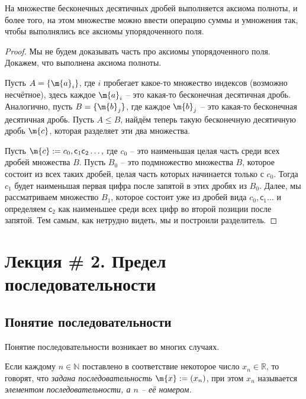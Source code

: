 \begin{theorem}
    На множестве бесконечных десятичных дробей выполняется аксиома полноты, и более того, на этом множестве можно ввести операцию суммы и умножения так, чтобы выполнялись все аксиомы упорядоченного поля. 
\end{theorem}
\begin{proof}
    Мы не будем доказывать часть про аксиомы упорядоченного поля. Докажем, что выполнена аксиома полноты.

    Пусть $A = \{\m{a}_i\}$, где $i$ пробегает какое-то множество индексов (возможно несчётное), здесь каждое $\m{a}_i$ -- это какая-то бесконечная десятичная дробь. Аналогично, пусть $B = \{\m{b}_j\}$, где каждое $\m{b}_j$ -- это какая-то бесконечная десятичная дробь. Пусть $A\le B$, найдём теперь такую бесконечную десятичную дробь $\m{c}$, которая разделяет эти два множества. 

    Пусть $\m{c}:= c_0,\mathsf{c}_1\mathsf{c}_2\ldots,$ где $c_0$ -- это наименьшая целая часть среди всех дробей множества $B$. Пусть $ B_0 $ -- это подмножество множества $B$, которое состоит из всех таких дробей, целая часть которых начинается только с $c_0$. Тогда $c_1$ будет наименьшая первая цифра после запятой в этих дробях из $B_0$. Далее, мы рассматриваем множество $B_1$, которое состоит уже из дробей вида $c_0,\mathsf{c}_1\ldots$ и определяем $\mathsf{c}_2$ как наименьшее среди всех цифр во второй позиции после запятой. Тем самым, как нетрудно видеть, мы и построили разделитель.
    
    \end{proof}


\section{Лекция \# 2. Предел последовательности}

\subsection{Понятие последовательности}

Понятие последовательности возникает во многих случаях. 

\begin{definition}\label{def_of_seqeunce}
    Если каждому $n \in \mathbb{N}$ поставлено в соответствие некоторое число $x_n \in \mathbb{R}$, то говорят, что \textit{задана последовательность} $\m{x}:=(x_n)$, при этом $x_n$ называется \textit{элементом последовательности, а $n$ -- её номером.}
\end{definition}


